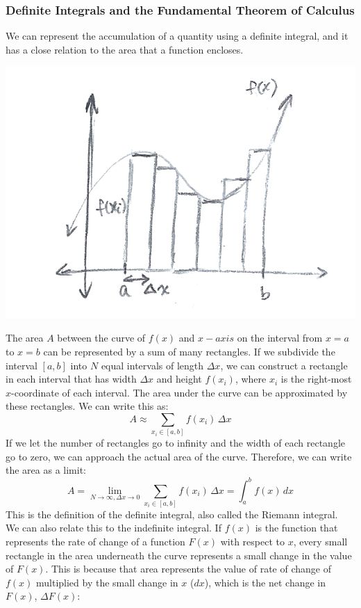 \subsubsection{Definite Integrals and the Fundamental Theorem of Calculus}
We can represent the accumulation of a quantity using a definite integral, and it has a close relation to the area that a function encloses. 
\begin{center}
	\includegraphics[scale=0.3]{images/math/calc/defintegral.png}
\end{center}
The area $A$ between the curve of $f(x)$ and $x-axis$ on the interval from $x = a$ to $x=b$ can be represented by a sum of many rectangles. If we subdivide the interval $[a,b]$ into $N$ equal intervals of length $\Delta x$, we can construct a rectangle in each interval that has width $\Delta x$ and height $f(x_i)$, where $x_i$ is the right-most $x$-coordinate of each interval. The area under the curve can be approximated by these rectangles. We can write this as:
\[
	A \approx \sum_{x_i \in [a,b]} f(x_i) \, \Delta x
\]
If we let the number of rectangles go to infinity and the width of each rectangle go to zero, we can approach the actual area of the curve. Therefore, we can write the area as a limit:
\[
	A = \lim_{N\to \infty , \Delta x \to 0} \sum_{x_i \in [a,b]} f(x_i) \, \Delta x = \int_a^b f(x) \, dx
\]
This is the definition of the definite integral, also called the Riemann integral. \\
We can also relate this to the indefinite integral. If $f(x)$ is the function that represents the rate of change of a function $F(x)$ with respect to $x$, every small rectangle in the area underneath the curve represents a small change in the value of $F(x)$. This is because that area represents the value of rate of change of $f(x)$ multiplied by the small change in $x$ ($dx$), which is the net change in $F(x)$, $\Delta F(x)$:
